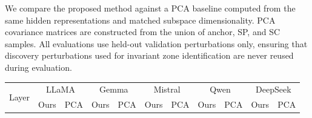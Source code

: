 We compare the proposed method against a PCA baseline computed from the same hidden representations and matched subspace dimensionality. PCA covariance matrices are constructed from the union of anchor, SP, and SC samples. All evaluations use held-out validation perturbations only, ensuring that discovery perturbations used for invariant zone identification are never reused during evaluation.

\begin{table}[!htbp]
\centering
\footnotesize
\setlength{\tabcolsep}{5pt}
\renewcommand{\arraystretch}{1.1}

\begin{tabular}{c|cc|cc|cc|cc|cc}
\hline
\multirow{2}{*}{Layer} 
& \multicolumn{2}{c|}{LLaMA} 
& \multicolumn{2}{c|}{Gemma} 
& \multicolumn{2}{c|}{Mistral} 
& \multicolumn{2}{c|}{Qwen} 
& \multicolumn{2}{c}{DeepSeek} \\

& Ours & PCA 
& Ours & PCA
& Ours & PCA
& Ours & PCA
& Ours & PCA \\
\hline


\end{tabular}
\end{table}

